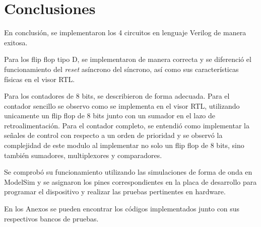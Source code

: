 \section{Conclusiones}
En conclusión, se implementaron los 4 circuitos en lenguaje Verilog de manera exitosa.

Para los flip flop tipo D, se implementaron de manera correcta y se diferenció el funcionamiento del \textit{reset} asíncrono del síncrono, así como sus características físicas en el visor RTL. 

Para los contadores de 8 bits, se describieron de forma adecuada. Para el contador sencillo se observo como se implementa en el visor RTL, utilizando unicamente un flip flop de 8 bits junto con un sumador en el lazo de retroalimentación. Para el contador completo, se entendió como implementar la señales de control con respecto a un orden de prioridad y se observó la complejidad de este modulo al implementar no solo un flip flop de 8 bits, sino también sumadores, multiplexores y comparadores.

Se comprobó su funcionamiento utilizando las simulaciones de forma de onda en ModelSim y se asignaron los pines correspondientes en la placa de desarrollo para programar el dispositivo y realizar las pruebas pertinentes en hardware.

En los Anexos se pueden encontrar los códigos implementados junto con sus respectivos bancos de pruebas.
